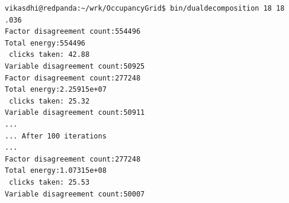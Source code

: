 \documentclass[10pt,oneside,letterpaper]{article}
\begin{document}
\lstset{language=Bash}
\begin{lstlisting}
vikasdhi@redpanda:~/wrk/OccupancyGrid$ bin/dualdecomposition 18 18 .036
Factor disagreement count:554496
Total energy:554496
 clicks taken: 42.88
Variable disagreement count:50925
Factor disagreement count:277248
Total energy:2.25915e+07
 clicks taken: 25.32
Variable disagreement count:50911
...
... After 100 iterations
...
Factor disagreement count:277248
Total energy:1.07315e+08
 clicks taken: 25.53
Variable disagreement count:50007
\end{lstlisting}




\end{document}

